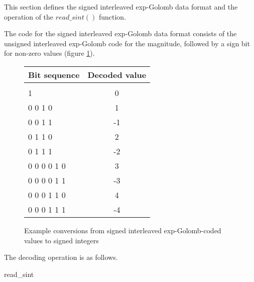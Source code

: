 This section defines the signed interleaved exp-Golomb data format and the operation
of the $read\_sint()$ function.

The code for the signed interleaved exp-Golomb data format consists of the
unsigned interleaved exp-Golomb code for the magnitude, followed by a sign bit
for non-zero values (figure \ref{segolcodings}).

\begin{figure}[h]
\begin{tabular}{l|c}
Bit sequence & Decoded value \\
\hline\\
1                 &  0\\
0 0 1 0           &  1\\
0 0 1 1           &  -1\\
0 1 1 0            &  2\\
0 1 1 1            &  -2\\
0 0 0 0 1 0         &  3\\
0 0 0 0 1 1         &  -3\\
0 0 0 1 1 0         &  4\\
0 0 0 1 1 1         &  -4\\

\end{tabular}

\caption{Example conversions from signed interleaved exp-Golomb-coded values 
to signed integers \label{segolcodings}}
\end{figure}

The decoding operation is as follows.

\begin{pseudo}{read\_sint}{}
\bsEND
{}

\end{pseudo}
